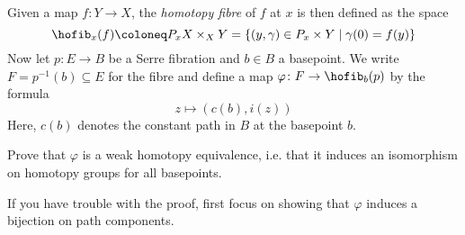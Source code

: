 \begin{exercise}
	Given a map $f\colon Y \to X$, the \emph{homotopy fibre} of $f$ at $x$ is then defined as the space
	\begin{equation*}
		\hofib_x(f) \coloneq P_x X \times_X Y = \{(y, \gamma) \in P_x \times Y \mid \gamma(0) = f(y)\}
	\end{equation*}
	Now let $p\colon E \to B$ be a Serre fibration and $b \in B$ a basepoint.
	We write $F = p^{-1}(b) \subseteq E$ for the fibre and define a map $\varphi\colon F \to \hofib_b(p)$ by the formula  
	\begin{equation*}
		z \mapsto (c(b), i(z))
	\end{equation*}
	Here, $c(b)$ denotes the constant path in $B$ at the basepoint $b$.

	Prove that $\varphi$ is a weak homotopy equivalence, i.e. that it induces an isomorphism on homotopy groups for all basepoints.
	\begin{hint}
		If you have trouble with the proof, first focus on showing that $\varphi$ induces a bijection on path components.
	\end{hint}
\end{exercise}

